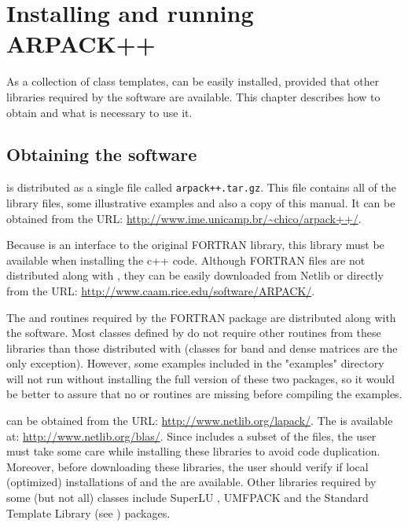 
\chapter{Installing and running ARPACK++}\label{installing}
As a collection of class templates, \ARPP{} can be easily installed, provided that other libraries required by the software are available. This chapter describes how to obtain \ARPP{} and what is necessary to use it.

\section{Obtaining the software}

\ARPP{} is distributed as a single file called \texttt{arpack++.tar.gz}. This file contains all of the library files, some illustrative examples and also a copy of this manual. It can be obtained from the URL: \url{http://www.ime.unicamp.br/~chico/arpack++/}.

Because \ARPP{} is an interface to the original \ARP{} FORTRAN library, this library must be available when installing the c++ code. Although FORTRAN files are not distributed along with \ARPP{}, they can be easily downloaded from Netlib or directly from the URL: \url{http://www.caam.rice.edu/software/ARPACK/}.

The \BLAS{} and \LAP{} routines required by the \ARP{} FORTRAN package are distributed along with the software. Most classes defined by \ARPP{} do not require other routines from these libraries than those distributed with \ARP{} (classes for band and dense matrices are the only exception). However, some examples included in the \ARPP{} "examples" directory will not run without installing the full version of these two packages, so it would be better to assure that no \LAP{} or \BLAS{} routines are missing before compiling the examples.

\LAP{} can be obtained from the URL: \url{http://www.netlib.org/lapack/}. The \BLAS{} is available at: \url{http://www.netlib.org/blas/}. Since \LAP{} includes a subset of the \BLAS{} files, the user must take some care while installing these libraries to avoid code duplication. Moreover, before downloading these libraries, the user should verify if local (optimized) installations of \LAP{} and the \BLAS{} are available. 
Other libraries required by some (but not all) \ARPP{} classes include SuperLU \cite{Li:1999:SuperLU}, UMFPACK \cite{Davis:1999:Sparse} and the Standard Template Library (see \cite{Nelson:1995:STL}) packages.

